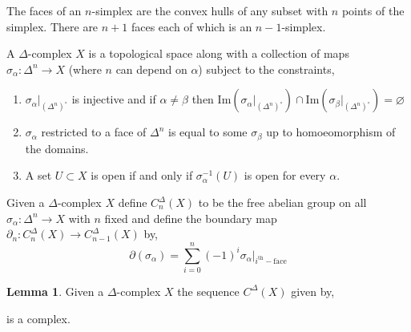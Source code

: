 \documentclass[12pt]{extarticle}
\renewcommand{\Im}[1]{\mathrm{Im}(#1)}
\theoremstyle{definition}
\newtheorem{lemma}[theorem]{Lemma}
\newenvironment{definition}[1][Definition:]{\begin{trivlist}
\item[\hskip \labelsep {\bfseries #1}]}{\end{trivlist}}
\begin{document}
\begin{definition}
The faces of an $n$-simplex are the convex hulls of any subset with $n$ points of the simplex. There are $n+1$ faces each of which is an $n-1$-simplex. 
\end{definition}

\begin{definition}
A $\Delta$-complex $X$ is a topological space along with a collection of maps $\sigma_\alpha : \Delta^n \to X$ (where $n$ can depend on $\alpha$) subject to the constraints,
\begin{enumerate}
\item $\sigma_\alpha|_{(\Delta^n)^\circ}$ is injective and if $\alpha \neq \beta$ then $\Im{\sigma_\alpha|_{(\Delta^n)^\circ}} \cap \Im{\sigma_\beta|_{(\Delta^n)^\circ}} = \varnothing$

\item $\sigma_\alpha$ restricted to a face of $\Delta^n$ is equal to some $\sigma_\beta$ up to homoeomorphism of the domains. 

\item A set $U \subset X$ is open if and only if $\sigma_\alpha^{-1}(U)$ is open for every $\alpha$. 
\end{enumerate}
\end{definition}

\begin{definition}
Given a $\Delta$-complex $X$ define $C^\Delta_n(X)$ to be the free abelian group on all $\sigma_\alpha : \Delta^n \to X$ with $n$ fixed and define the boundary map $\partial_n  : C^\Delta_n(X) \to C^\Delta_{n-1}(X)$ by, 
\[\partial(\sigma_\alpha) = \sum_{i = 0}^n (-1)^i \sigma_\alpha|_{i^{\mathrm{th}}-\text{face}} \]

\end{definition}

\begin{lemma}
Given a $\Delta$-complex $X$ the sequence $C^\Delta(X)$ given by,
\begin{center}
\end{center}
is a complex.
\end{lemma}
\end{document}
